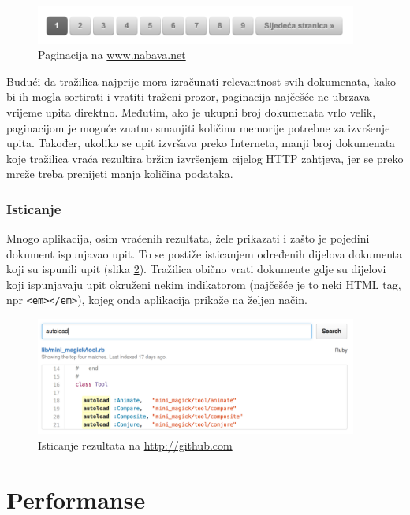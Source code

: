 \documentclass[a4paper,twoside,12pt]{scrreprt}
\begin{document}
\begin{figure}[H]
  \centering
  \includegraphics[width=300pt]{pagination}
  \caption{Paginacija na \url{www.nabava.net}}
  \label{pagination}
\end{figure}

Budući da tražilica najprije mora izračunati relevantnost svih dokumenata, kako bi ih mogla sortirati i vratiti traženi prozor, paginacija najčešće ne ubrzava vrijeme upita direktno. Međutim, ako je ukupni broj dokumenata vrlo velik, paginacijom je moguće znatno smanjiti količinu memorije potrebne za izvršenje upita. Također, ukoliko se upit izvršava preko Interneta, manji broj dokumenata koje tražilica vraća rezultira bržim izvršenjem cijelog HTTP zahtjeva, jer se preko mreže treba prenijeti manja količina podataka.

\subsection{Isticanje}

Mnogo aplikacija, osim vraćenih rezultata, žele prikazati i zašto je pojedini dokument ispunjavao upit. To se postiže isticanjem određenih dijelova dokumenta koji su ispunili upit (slika \ref{highlighting}). Tražilica obično vrati dokumente gdje su dijelovi koji ispunjavaju upit okruženi nekim indikatorom (najčešće je to neki HTML tag, npr \texttt{<em></em>}), kojeg onda aplikacija prikaže na željen način.

\begin{figure}[H]
  \centering
  \includegraphics[width=300pt]{highlighting}
  \caption{Isticanje rezultata na \url{http://github.com}}
  \label{highlighting}
\end{figure}

\chapter{Performanse}
\end{document}
